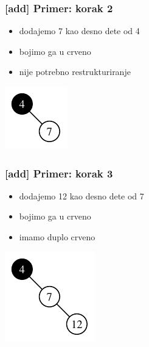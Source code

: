 \documentclass[compress]{beamer}
\begin{document}
\begin{frame}[fragile]
  \frametitle{[add] Primer: korak 2}
  \begin{itemize}
    \item dodajemo 7 kao desno dete od 4
    \item bojimo ga u crveno
    \item nije potrebno restrukturiranje
  \end{itemize}
  \begin{center}
    \includegraphics[scale=1.0]{asp-11-add-02.pdf}
  \end{center}
\end{frame}

\begin{frame}[fragile]
  \frametitle{[add] Primer: korak 3}
  \begin{itemize}
    \item dodajemo 12 kao desno dete od 7
    \item bojimo ga u crveno
    \item imamo duplo crveno
  \end{itemize}
  \begin{center}
    \includegraphics[scale=1.0]{asp-11-add-03.pdf}
  \end{center}
\end{frame}
\end{document}
